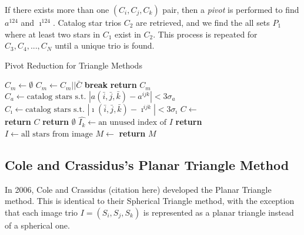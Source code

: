 If there exists more than one $(C_i, C_j, C_k)$ pair, then a \textit{pivot} is performed to find $a^{124}$ and $\imath^{124}$. Catalog star trios $C_2$ are retrieved, and we find the all sets $P_1$ where at least two stars in $C_1$ exist in $C_2$. This process is repeated for $C_3, C_4, ..., C_N$ until a unique trio is found. 
\begin{algorithm}
\caption{Pivot Reduction for Triangle Methods}\label{Pivot}
\begin{algorithmic}[1]

\State $C_m \gets \emptyset$
\State $C_m \gets C_m || \bar{C}$
\State \textbf{break}
\EndIf
\EndFor
\EndFor
\State \textbf{return} $C_m$
\EndFunction
\\

\State $C_a \gets \text{catalog stars s.t. } |a(\bar{i}, \bar{j}, \bar{k}) - a^{ijk}| < 3 \sigma_a$
\State $C_{\imath} \gets \text{catalog stars s.t. } |\imath(\bar{i}, \bar{j}, \bar{k}) - \imath^{ijk}| < 3 \sigma_{\imath}$
\State $C \gets $ 
\\

\State \textbf{return} $C$
\State \textbf{return} $\emptyset$
\Else
\State $\hat{I_k} \gets \text{an unused index of } I$
\State \textbf{return} 
\EndIf
\EndFunction
\\

\State $I \gets \text{all stars from image}$
\State $M \gets$ 
\State \textbf{return} $M$
\EndIf
\EndFor
\EndFor
\EndFor
\EndProcedure
\end{algorithmic}
\end{algorithm}

\subsection{Cole and Crassidus's Planar Triangle Method}
In 2006, Cole and Crassidus (citation here) developed the Planar Triangle method. This is identical to their Spherical Triangle method, with the exception that each image trio $I = (S_i, S_j, S_k)$ is represented as a planar triangle instead of a spherical one. 

